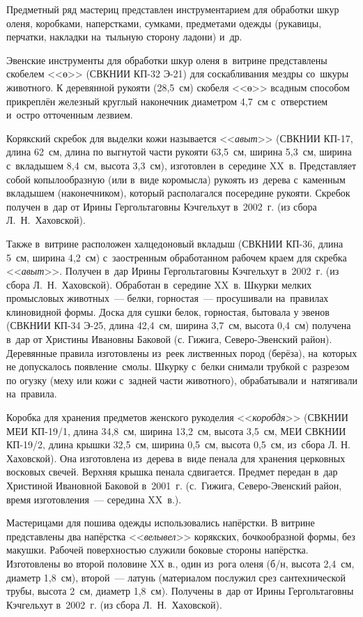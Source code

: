 Предметный ряд мастериц представлен инструментарием для обработки шкур оленя, коробками, наперстками, сумками, предметами одежды (рукавицы, перчатки, накладки на~тыльную сторону ладони) и~др.

Эвенские инструменты для обработки шкур оленя в~витрине представлены скобелем <<ө>> (СВКНИИ КП-32 Э-21) для соскабливания мездры со~шкуры животного. К деревянной рукояти (28,5~см) скобеля <<ө>> всадным способом прикреплён железный круглый наконечник диаметром 4,7~см с~отверстием и~остро отточенным лезвием.

Корякский скребок для выделки кожи называется <<\textit{авыт}>> (СВКНИИ КП-17, длина 62~см, длина по выгнутой части рукояти 63,5~см, ширина 5,3~см, ширина с~вкладышем 8,4~см, высота 3,3~см), изготовлен в~середине XX~в. Представляет собой копылообразную (или в~виде коромысла) рукоять из~дерева с~каменным вкладышем (наконечником), который располагался посередине рукояти. Скребок получен в~дар от Ирины Гергольтаговны Кэчгельхут в~2002~г. (из сбора Л.~Н.~Хаховской).

Также в~витрине расположен халцедоновый вкладыш (СВКНИИ КП-36, длина 5~см, ширина 4,2~см) с~заостренным обработанном рабочем краем для скребка <<\textit{авыт}>>. Получен в~дар Ирины Гергольтаговны Кэчгельхут в~2002~г. (из сбора Л.~Н.~Хаховской). Обработан в~середине XX~в.
\clearpage
Шкурки мелких промысловых животных~--- белки, горностая~--- просушивали на~правилах клиновидной формы. Доска для сушки белок, горностая, бытовала у эвенов (СВКНИИ КП-34 Э-25, длина 42,4~см, ширина 3,7~см, высота 0,4~см) получена в~дар от Христины Ивановны Баковой (с. Гижига, Северо-Эвенский район). Деревянные правила изготовлены из~реек лиственных пород (берёза), на~которых не допускалось появление~смолы. Шкурку с~белки снимали трубкой с~разрезом по огузку (меху или кожи с~задней части животного), обрабатывали и~натягивали на~правила.

Коробка для хранения предметов женского рукоделия <<\textit{коробдя}>> (СВКНИИ МЕИ КП-19/1, длина 34,8~см, ширина 13,2~см, высота 3,5~см, МЕИ СВКНИИ КП-19/2, длина крышки 32,5~см, ширина 0,5~см, высота 0,5~см, из~сбора Л. Н. Хаховской). Она изготовлена из~дерева в~виде пенала для хранения церковных восковых свечей. Верхняя крышка пенала сдвигается. Предмет передан в~дар Христиной Ивановной Баковой в~2001~г. (с.~Гижига, Северо-Эвенский район, время изготовления~--- середина XX~в.).

Мастерицами для пошива одежды использовались напёрстки. В витрине представлены два напёрстка <<\textit{велывел}>> корякских, бочкообразной формы, без макушки. Рабочей поверхностью служили боковые стороны напёрстка. Изготовлены во второй половине XX в., один из~рога оленя (б/н, высота 2,4~см, диаметр 1,8~см), второй~--- латунь (материалом послужил срез сантехнической трубы, высота 2~см, диаметр 1,8~см). Получены в~дар от Ирины Гергольтаговны Кэчгельхут в~2002~г. (из сбора Л.~Н.~Хаховской).

